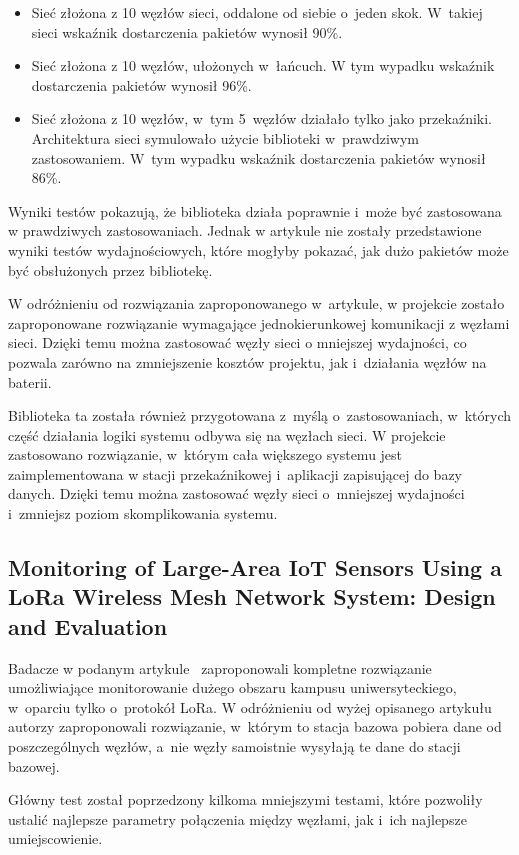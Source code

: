 \begin{itemize}
    \item Sieć złożona z 10 węzłów sieci, oddalone od siebie o~jeden skok. W~takiej sieci wskaźnik dostarczenia pakietów wynosił 90\%.
    \item Sieć złożona z 10 węzłów, ułożonych w~łańcuch. W tym wypadku wskaźnik dostarczenia pakietów wynosił 96\%.
    \item Sieć złożona z 10 węzłów, w~tym 5~węzłów działało tylko jako przekaźniki. Architektura sieci symulowało użycie biblioteki w~prawdziwym zastosowaniem. W~tym wypadku wskaźnik dostarczenia pakietów wynosił 86\%.
\end{itemize}

Wyniki testów pokazują, że biblioteka działa poprawnie i~może być zastosowana w prawdziwych zastosowaniach.
Jednak w artykule nie zostały przedstawione wyniki testów wydajnościowych, które mogłyby pokazać, jak dużo pakietów może być obsłużonych przez bibliotekę.

W odróżnieniu od rozwiązania zaproponowanego w~artykule, w projekcie zostało zaproponowane rozwiązanie wymagające jednokierunkowej komunikacji z węzłami sieci.
Dzięki temu można zastosować węzły sieci o mniejszej wydajności, co pozwala zarówno na zmniejszenie kosztów projektu, jak i~działania węzłów na baterii.

Biblioteka ta została również przygotowana z~myślą o~zastosowaniach, w~których część działania logiki systemu odbywa się na węzłach sieci.
W projekcie zastosowano rozwiązanie, w~którym cała większego systemu jest zaimplementowana w stacji przekaźnikowej i~aplikacji zapisującej do bazy danych.
Dzięki temu można zastosować węzły sieci o~mniejszej wydajności i~zmniejsz poziom skomplikowania systemu.

\subsection{Monitoring of Large-Area IoT Sensors Using a LoRa Wireless Mesh Network System: Design and Evaluation}

Badacze w podanym artykule~\cite{bib:loramesh-lee} zaproponowali kompletne rozwiązanie umożliwiające monitorowanie dużego obszaru kampusu uniwersyteckiego, w~oparciu tylko o~protokół LoRa.
W odróżnieniu od wyżej opisanego artykułu autorzy zaproponowali rozwiązanie, w~którym to stacja bazowa pobiera dane od poszczególnych węzłów, a~nie węzły samoistnie wysyłają te dane do stacji bazowej.

Główny test został poprzedzony kilkoma mniejszymi testami, które pozwoliły ustalić najlepsze parametry połączenia między węzłami, jak i~ich najlepsze umiejscowienie.

